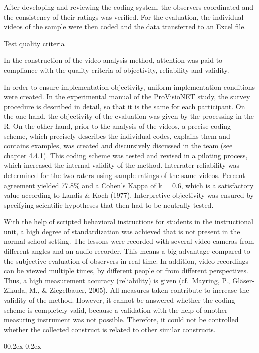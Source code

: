 \documentclass[
  man]{apa6}
\makeatletter
\let\oldsubparagraph\subparagraph
\renewcommand{\subparagraph}[1]{\oldsubparagraph{#1}\mbox{}}
\renewcommand{\subparagraph}[1]{\@startsection{subparagraph}{5}{1em}%
  {0\baselineskip \@plus 0.2ex \@minus 0.2ex}%
  {-\z@\relax}%
  {\normalfont\normalsize\itshape\hspace{\parindent}{#1}\textit{\addperi}}{\relax}}
\makeatother
\begin{document}
After developing and reviewing the coding system, the observers coordinated and the consistency of their ratings was verified. For the evaluation, the individual videos of the sample were then coded and the data transferred to an Excel file.

Test quality criteria

In the construction of the video analysis method, attention was paid to compliance with the quality criteria of objectivity, reliability and validity.

In order to ensure implementation objectivity, uniform implementation conditions were created. In the experimental manual of the ProVisioNET study, the survey procedure is described in detail, so that it is the same for each participant. On the one hand, the objectivity of the evaluation was given by the processing in the R. On the other hand, prior to the analysis of the videos, a precise coding scheme, which precisely describes the individual codes, explains them and contains examples, was created and discursively discussed in the team (see chapter 4.4.1). This coding scheme was tested and revised in a piloting process, which increased the internal validity of the method. Interrater reliability was determined for the two raters using sample ratings of the same videos. Percent agreement yielded 77.8\% and a Cohen's Kappa of k = 0.6, which is a satisfactory value according to Landis \& Koch (1977). Interpretive objectivity was ensured by specifying scientific hypotheses that then had to be neutrally tested.

With the help of scripted behavioral instructions for students in the instructional unit, a high degree of standardization was achieved that is not present in the normal school setting. The lessons were recorded with several video cameras from different angles and an audio recorder. This means a big advantage compared to the subjective evaluation of observers in real time. In addition, video recordings can be viewed multiple times, by different people or from different perspectives. Thus, a high measurement accuracy (reliability) is given (cf.~Mayring, P., Gläser-Zikuda, M., \& Ziegelbauer, 2005). All measures taken contribute to increase the validity of the method. However, it cannot be answered whether the coding scheme is completely valid, because a validation with the help of another measuring instrument was not possible. Therefore, it could not be controlled whether the collected construct is related to other similar constructs.

\hypertarget{coding-time-on-task}{%
\subparagraph{Coding Time on Task}\label{coding-time-on-task}}
\end{document}
